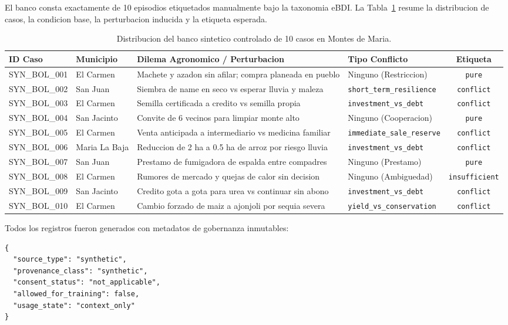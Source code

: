 \documentclass[11pt,a4paper]{article}
\begin{document}
El banco consta exactamente de 10 episodios etiquetados manualmente bajo la taxonomia eBDI. La Tabla~\ref{tab:synthetic_cases} resume la distribucion de casos, la condicion base, la perturbacion inducida y la etiqueta esperada.

\begin{table}[H]
\centering
\small
\begin{tabularx}{\textwidth}{llXlc}
\toprule
\textbf{ID Caso} & \textbf{Municipio} & \textbf{Dilema Agronomico / Perturbacion} & \textbf{Tipo Conflicto} & \textbf{Etiqueta} \\
\midrule
SYN\_BOL\_001 & El Carmen & Machete y azadon sin afilar; compra planeada en pueblo & Ninguno (Restriccion) & \texttt{pure} \\
SYN\_BOL\_002 & San Juan & Siembra de name en seco vs esperar lluvia y maleza & \texttt{short\_term\_resilience} & \texttt{conflict} \\
SYN\_BOL\_003 & El Carmen & Semilla certificada a credito vs semilla propia & \texttt{investment\_vs\_debt} & \texttt{conflict} \\
SYN\_BOL\_004 & San Jacinto & Convite de 6 vecinos para limpiar monte alto & Ninguno (Cooperacion) & \texttt{pure} \\
SYN\_BOL\_005 & El Carmen & Venta anticipada a intermediario vs medicina familiar & \texttt{immediate\_sale\_reserve} & \texttt{conflict} \\
SYN\_BOL\_006 & Maria La Baja & Reduccion de 2 ha a 0.5 ha de arroz por riesgo lluvia & \texttt{investment\_vs\_debt} & \texttt{conflict} \\
SYN\_BOL\_007 & San Juan & Prestamo de fumigadora de espalda entre compadres & Ninguno (Prestamo) & \texttt{pure} \\
SYN\_BOL\_008 & El Carmen & Rumores de mercado y quejas de calor sin decision & Ninguno (Ambiguedad) & \texttt{insufficient} \\
SYN\_BOL\_009 & San Jacinto & Credito gota a gota para urea vs continuar sin abono & \texttt{investment\_vs\_debt} & \texttt{conflict} \\
SYN\_BOL\_010 & El Carmen & Cambio forzado de maiz a ajonjoli por sequia severa & \texttt{yield\_vs\_conservation} & \texttt{conflict} \\
\bottomrule
\end{tabularx}
\caption{Distribucion del banco sintetico controlado de 10 casos en Montes de Maria.}
\label{tab:synthetic_cases}
\end{table}

Todos los registros fueron generados con metadatos de gobernanza inmutables:
\begin{lstlisting}
{
  "source_type": "synthetic",
  "provenance_class": "synthetic",
  "consent_status": "not_applicable",
  "allowed_for_training": false,
  "usage_state": "context_only"
}
\end{lstlisting}
\end{document}
